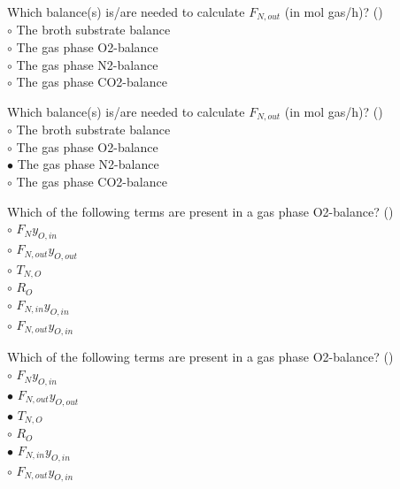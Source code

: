 \documentclass[]{beamer}
\begin{document}
\begin{frame}[shrink] {}
\addtocounter{questions}{1}
\color{blue}
Which balance(s) is/are needed to calculate $F_{N,out}$ (in mol gas/h)?  ()\\
\color{black}
\setlength{\parindent}{-0.4cm}
{\color{red}$\circ$}    The broth substrate balance  \\
{\color{red}$\circ$} The gas phase O2-balance  \\
{\color{red}$\circ$} The gas phase N2-balance\\
{\color{red}$\circ$} The gas phase CO2-balance  \\
\end{frame}
\begin{frame}[shrink] {}
\addtocounter{answers}{1}
\color{blue}
Which balance(s) is/are needed to calculate $F_{N,out}$ (in mol gas/h)?  ()\\
\color{black}
\setlength{\parindent}{-0.4cm}
{\color{red}$\circ$}    The broth substrate balance  \\
{\color{red}$\circ$} The gas phase O2-balance  \\
{\color{red}$\bullet$} The gas phase N2-balance\\
{\color{red}$\circ$} The gas phase CO2-balance  \\
\end{frame}

\begin{frame}[shrink] {}
\addtocounter{questions}{1}
\color{blue}
Which of the following terms are present in a gas phase O2-balance?  ()\\
\color{black}
\setlength{\parindent}{-0.4cm}
{\color{red}$\circ$}   $F_{N}y_{O,in}$\\
{\color{red}$\circ$}   $F_{N,out}y_{O,out}$\\
{\color{red}$\circ$} $T_{N,O}$\\
{\color{red}$\circ$} $R_O$\\
{\color{red}$\circ$}   $F_{N,in}y_{O,in}$  \\
{\color{red}$\circ$}   $F_{N,out}y_{O,in}$
\end{frame}
\begin{frame}[shrink] {}
\addtocounter{answers}{1}
\color{blue}
Which of the following terms are present in a gas phase O2-balance?  ()\\
\color{black}
\setlength{\parindent}{-0.4cm}
{\color{red}$\circ$}   $F_{N}y_{O,in}$\\
{\color{red}$\bullet$}   $F_{N,out}y_{O,out}$\\
{\color{red}$\bullet$} $T_{N,O}$\\
{\color{red}$\circ$} $R_O$\\
{\color{red}$\bullet$}   $F_{N,in}y_{O,in}$  \\
{\color{red}$\circ$}   $F_{N,out}y_{O,in}$
\end{frame}
\end{document}
